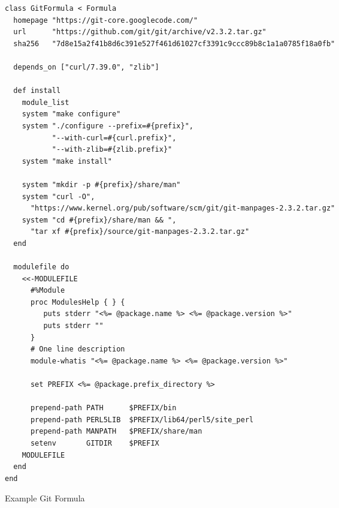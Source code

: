 \documentclass{acm_proc_article-sp}
\begin{document}
\begin{figure*} %
\begin{verbatim}
class GitFormula < Formula
  homepage "https://git-core.googlecode.com/"
  url      "https://github.com/git/git/archive/v2.3.2.tar.gz"
  sha256   "7d8e15a2f41b8d6c391e527f461d61027cf3391c9ccc89b8c1a1a0785f18a0fb"

  depends_on ["curl/7.39.0", "zlib"]

  def install
    module_list
    system "make configure"
    system "./configure --prefix=#{prefix}",
           "--with-curl=#{curl.prefix}",
           "--with-zlib=#{zlib.prefix}"
    system "make install"

    system "mkdir -p #{prefix}/share/man"
    system "curl -O",
      "https://www.kernel.org/pub/software/scm/git/git-manpages-2.3.2.tar.gz"
    system "cd #{prefix}/share/man && ",
      "tar xf #{prefix}/source/git-manpages-2.3.2.tar.gz"
  end

  modulefile do
    <<-MODULEFILE
      #%Module
      proc ModulesHelp { } {
         puts stderr "<%= @package.name %> <%= @package.version %>"
         puts stderr ""
      }
      # One line description
      module-whatis "<%= @package.name %> <%= @package.version %>"

      set PREFIX <%= @package.prefix_directory %>

      prepend-path PATH      $PREFIX/bin
      prepend-path PERL5LIB  $PREFIX/lib64/perl5/site_perl
      prepend-path MANPATH   $PREFIX/share/man
      setenv       GITDIR    $PREFIX
    MODULEFILE
  end
end
\end{verbatim}
\caption{Example Git Formula}
\label{fig:GitFormula}
\end{figure*}
\end{document}
